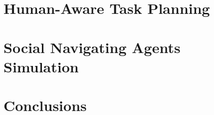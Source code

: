 \documentclass[english,a4paper,11pt,twoside]{StyleThese}
\begin{document}



\cleardoublepage %

\dominitoc


\cleardoublepage %

%


\tableofcontents

\printnoidxglossary[type=\acronymtype] %
%

\mainmatter



\part{Human-Aware Task Planning} \label{part:1}







\part{Social Navigating Agents Simulation} \label{part:2}




\part{Conclusions}

\end{document}
